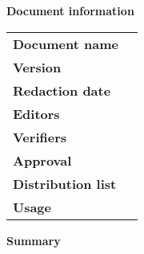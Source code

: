 \begin{center}
	\textbf{\Large Document information} \\[0.5cm]
	\begin{longtable}{ l | p{6cm} }
		\textbf{Document name} &  {\documentName}\\
		\textbf{Version} & {\currentVersion} \\
		\textbf{Redaction date} & {\redactionDate} \\
		\textbf{Editors} & \parbox{\textwidth}{\editors} \\
		\textbf{Verifiers} & \parbox{\textwidth}{\verifiers} \\
		\textbf{Approval} & \parbox{\textwidth}{\approved} \\
		\textbf{Distribution list} & \parbox{\textwidth}{\distributionList} \\
		\textbf{Usage} & \parbox{\textwidth}{\usage} 
		\\
	\end{longtable}
	\vspace{0.5cm}
\textbf{\Large Summary} \\[0.4cm]
\sommario
\end{center}
